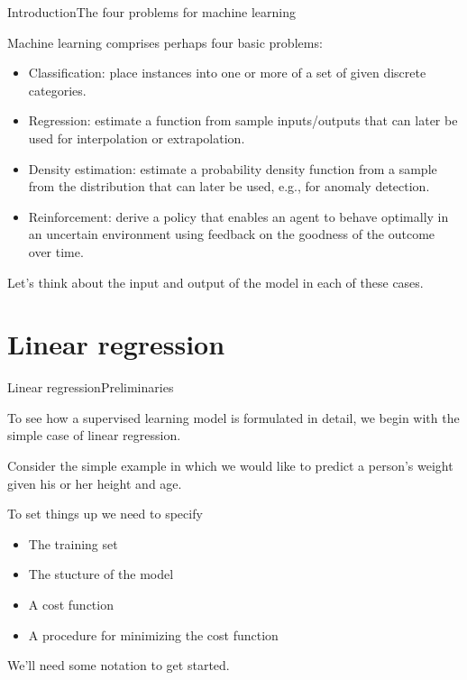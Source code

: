 \documentclass{beamer}
\begin{document}
\begin{frame}{Introduction}{The four problems for machine learning}

  Machine learning comprises perhaps four basic problems:
  \begin{itemize}
  \item \alert{Classification}: place instances into one or more of a
    set of given discrete \alert{categories}.
  \item \alert{Regression}: estimate a function from sample
    inputs/outputs that can later be used for \alert{interpolation} or
    \alert{extrapolation}.
  \item \alert{Density estimation}: estimate a probability density
    function from a sample from the distribution that can later be used,
    e.g., for \alert{anomaly detection}.
  \item \alert{Reinforcement}: derive a \alert{policy} that enables an
    agent to behave optimally in an uncertain environment using
    \alert{feedback} on the goodness of the outcome over time.
  \end{itemize}

  \medskip

  Let's think about the input and output of the model in each of these
  cases.
  
\end{frame}


\section{Linear regression}

\begin{frame}{Linear regression}{Preliminaries}

  To see how a supervised learning model is formulated in detail, we
  begin with the simple case of \alert{linear regression}.

  \medskip
  
  Consider the simple example in which we would like to \alert{predict
    a person's weight} given his or her \alert{height} and
  \alert{age}.

  \medskip

  To set things up we need to specify
  \begin{itemize}
  \item The training set
  \item The stucture of the model
  \item A cost function
  \item A procedure for minimizing the cost function
  \end{itemize}

  \medskip

  We'll need some notation to get started.
  
\end{frame}
\end{document}
